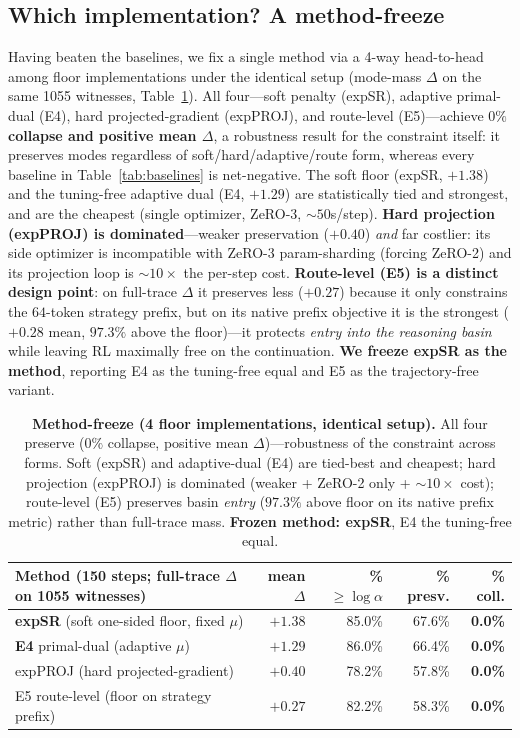 \documentclass[11pt]{article}
\theoremstyle{definition}
\begin{document}
\subsection{Which implementation? A method-freeze}
Having beaten the baselines, we fix a single method via a 4-way head-to-head among floor
implementations under the identical setup (mode-mass $\Delta$ on the same 1055 witnesses,
Table~\ref{tab:methodfreeze}). All four---soft penalty (expSR), adaptive primal-dual (E4), hard
projected-gradient (expPROJ), and route-level (E5)---achieve \textbf{$0\%$ collapse and positive mean
$\Delta$}, a robustness result for the constraint itself: it preserves modes regardless of
soft/hard/adaptive/route form, whereas every baseline in Table~\ref{tab:baselines} is net-negative.
The soft floor (expSR, $+1.38$) and the tuning-free adaptive dual (E4, $+1.29$) are statistically tied
and strongest, and are the cheapest (single optimizer, ZeRO-3, ${\sim}50$s/step). \textbf{Hard
projection (expPROJ) is dominated}---weaker preservation ($+0.40$) \emph{and} far costlier: its side
optimizer is incompatible with ZeRO-3 param-sharding (forcing ZeRO-2) and its projection loop is
${\sim}10\times$ the per-step cost. \textbf{Route-level (E5) is a distinct design point}: on full-trace
$\Delta$ it preserves less ($+0.27$) because it only constrains the $64$-token strategy prefix, but on
its native prefix objective it is the strongest ($+0.28$ mean, $97.3\%$ above the floor)---it protects
\emph{entry into the reasoning basin} while leaving RL maximally free on the continuation. \textbf{We
freeze expSR as the method}, reporting E4 as the tuning-free equal and E5 as the trajectory-free variant.

\begin{table}[h]\centering\small
\begin{tabular}{lrrrr}
\toprule
Method (150 steps; full-trace $\Delta$ on 1055 witnesses) & mean $\Delta$ & \% $\ge\log\alpha$ & \% presv. & \% coll. \\
\midrule
\textbf{expSR} (soft one-sided floor, fixed $\mu$) & $\mathbf{+1.38}$ & 85.0\% & 67.6\% & \textbf{0.0\%}\\
\textbf{E4} primal-dual (adaptive $\mu$) & $+1.29$ & 86.0\% & 66.4\% & \textbf{0.0\%}\\
expPROJ (hard projected-gradient) & $+0.40$ & 78.2\% & 57.8\% & \textbf{0.0\%}\\
E5 route-level (floor on strategy prefix) & $+0.27$ & 82.2\% & 58.3\% & \textbf{0.0\%}\\
\bottomrule
\end{tabular}
\caption{\textbf{Method-freeze (4 floor implementations, identical setup).} All four preserve
($0\%$ collapse, positive mean $\Delta$)---robustness of the constraint across forms. Soft (expSR) and
adaptive-dual (E4) are tied-best and cheapest; hard projection (expPROJ) is dominated (weaker + ZeRO-2
only + ${\sim}10\times$ cost); route-level (E5) preserves basin \emph{entry} ($97.3\%$ above floor on
its native prefix metric) rather than full-trace mass. \textbf{Frozen method: expSR}, E4 the tuning-free
equal.}
\label{tab:methodfreeze}
\end{table}
\end{document}
